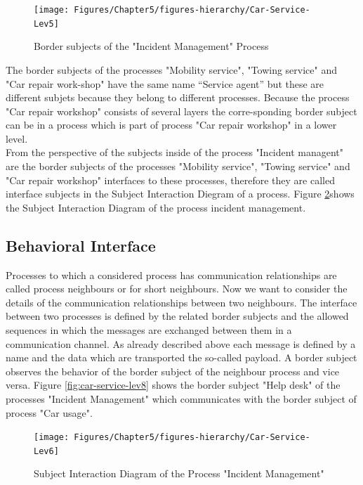 \begin{figure}[htbp]
	\centering
	\texttt{[image: Figures/Chapter5/figures-hierarchy/Car-Service-Lev5]}
	\caption[Border subjects of the "Incident Management" Process]{Border subjects of the "Incident Management" Process}
	\label{fig:car-service-lev5}
\end{figure}

The border subjects of the processes "Mobility service", "Towing service" and "Car repair work-shop" have the same name “Service agent” but these are different subjets because they belong to different processes. Because the process "Car repair workshop" consists of several layers the corre-sponding border subject can be in a process which is part of process "Car repair workshop" in a lower level.\\
From the perspective of the subjects inside of the process "Incident managent" are the border subjects of the processes "Mobility service", "Towing service" and "Car repair workshop" interfaces to these processes, therefore they are called interface subjects in the Subject Interaction Diegram of a process. Figure \ref{fig:car-service-lev6}shows the Subject Interaction Diagram of the process incident management.\\


\subsection{Behavioral Interface}
Processes to which a considered process has communication relationships are called process neighbours or for short neighbours. Now we want to consider the details of the communication relationships between two neighbours. The interface between two processes is defined by the related border subjects and the allowed sequences in which the messages are exchanged between them in a communication channel. As already described above each message is defined by a name and the data which are transported the so-called payload. A border subject observes the behavior of the border subject of the neighbour process and vice versa. Figure \ref{fig:car-service-lev8} shows the border subject "Help desk" of the processes "Incident Management" which communicates with the border subject of process "Car usage".\\

\begin{figure}[htbp]
	\centering
	\texttt{[image: Figures/Chapter5/figures-hierarchy/Car-Service-Lev6]}
	\caption[Subject Interaction Diagram of the Process "Incident Management"]{Subject Interaction Diagram of the Process "Incident Management"}
	\label{fig:car-service-lev6}
\end{figure}

